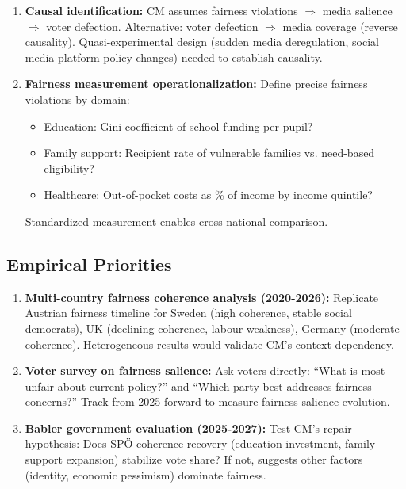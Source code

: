 \begin{enumerate}
\item \textbf{Causal identification:} CM assumes fairness violations $\Rightarrow$ media salience $\Rightarrow$
voter defection. Alternative: voter defection $\Rightarrow$ media coverage (reverse causality).
Quasi-experimental design (sudden media deregulation, social media platform policy changes)
needed to establish causality.

\item \textbf{Fairness measurement operationalization:} Define precise fairness violations by domain:
   \begin{itemize}[nosep]
   \item Education: Gini coefficient of school funding per pupil?
   \item Family support: Recipient rate of vulnerable families vs. need-based eligibility?
   \item Healthcare: Out-of-pocket costs as \% of income by income quintile?
   \end{itemize}
   Standardized measurement enables cross-national comparison.

\end{enumerate}

\subsection{Empirical Priorities}

\begin{enumerate}
\item \textbf{Multi-country fairness coherence analysis (2020-2026):} Replicate Austrian fairness
timeline for Sweden (high coherence, stable social democrats), UK (declining coherence, labour weakness),
Germany (moderate coherence). Heterogeneous results would validate CM's context-dependency.

\item \textbf{Voter survey on fairness salience:} Ask voters directly: ``What is most unfair about
current policy?'' and ``Which party best addresses fairness concerns?'' Track from 2025 forward
to measure fairness salience evolution.

\item \textbf{Babler government evaluation (2025-2027):} Test CM's repair hypothesis: Does SPÖ
coherence recovery (education investment, family support expansion) stabilize vote share?
If not, suggests other factors (identity, economic pessimism) dominate fairness.

\end{enumerate}

